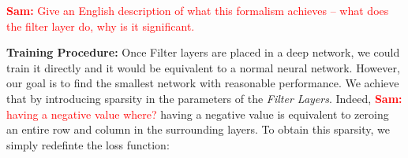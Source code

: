 \documentclass[sigconf]{acmart}
\newcommand{\srm}[1]{\textcolor{red}{{\bf Sam:} #1}}
\begin{document}

\srm{Give an English description of what this formalism
achieves -- what does the filter layer do, why is it significant.}


%
%
%

\textbf{Training Procedure: } Once Filter layers are placed in a deep network, 
we could train it directly and it
would be equivalent to a normal neural network. However, our goal is to find the
smallest network with reasonable performance. We achieve that by introducing
sparsity in the parameters of the \textit{Filter Layers}. Indeed, \srm{having a
negative value where?} having a negative value is equivalent to zeroing an
entire row and column in the surrounding layers. To obtain this sparsity, we
simply redefinte the loss function:
\end{document}
